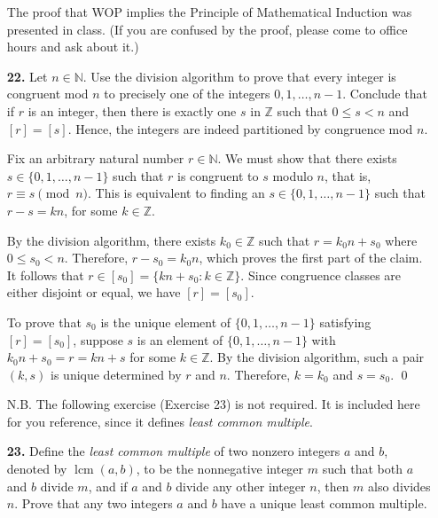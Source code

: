 \documentclass[12pt,reqno]{amsart}
\newcommand{\N}{\ensuremath{\mathbb{N}}}
\newcommand{\Z}{\ensuremath{\mathbb{Z}}}
\newcommand{\boldemph}{\emph}
\newcommand{\lcm}{\operatorname{lcm}}
\begin{document}
\begin{enumerate}
The proof that WOP implies the Principle of Mathematical Induction was presented
in class.  (If you are confused by the proof, please come to office hours and
ask about it.) 

\bigskip

\item[{\bf 22.}]
Let $n \in {\mathbb N}$.  Use the division algorithm to prove that every integer
is congruent mod $n$ to precisely one of the integers $0, 1, \ldots, n-1$.
Conclude that if $r$ is an integer, then there is exactly one $s$ in 
${\mathbb Z}$ such that $0 \leq s < n$ and $[r] = [s]$.   Hence, the integers
are indeed partitioned by congruence mod $n$.  

\bigskip
{}
Fix an arbitrary natural number $r \in \N$.  We must show that there exists 
$s \in \{0, 1, \dots, n-1\}$ such that $r$ is congruent to $s$ modulo $n$, that is,
$r \equiv s \pmod n$.
This is equivalent to finding an $s \in \{0, 1, \dots, n-1\}$ such that
$r-s = kn$, for some $k\in \Z$.  

By the division algorithm, there exists $k_0 \in \Z$ such that $r = k_0n + s_0$ where
$0\leq s_0 < n$.  Therefore, $r-s_0 = k_0n$, which proves the first part of the claim.
It follows that $r \in [s_0] = \{ kn + s_0 : k \in \Z\}$. 
Since congruence classes are either disjoint or equal, we have $[r] = [s_0]$.

To prove that $s_0$ is the unique element of $\{0, 1, \dots, n-1\}$ satisfying 
$[r] = [s_0]$, suppose $s$ is an element of $\{0, 1, \dots, n-1\}$ with
$k_0n+s_0 = r = kn+s$ for some $k\in \Z$.  By the division algorithm, such a
pair $(k, s)$ is unique determined by $r$ and $n$.  Therefore, $k=k_0$ and $s=s_0$.
\qed

\bigskip


\noindent N.B. The following exercise (Exercise 23) is not required. It is
included here for you reference, since it defines \emph{least common multiple}. 

\medskip

\item[{\bf 23.}]
Define the \boldemph{least common multiple} of two nonzero integers $a$ and $b$,
denoted by $\lcm(a,b)$\label{leastcm}, to be the nonnegative integer $m$ such
that both $a$ and $b$ divide $m$, and if $a$ and $b$  divide any other integer
$n$, then $m$ also divides $n$.  Prove that any two integers $a$ and $b$ have a
unique least common multiple.  


\end{enumerate}
\end{document}
